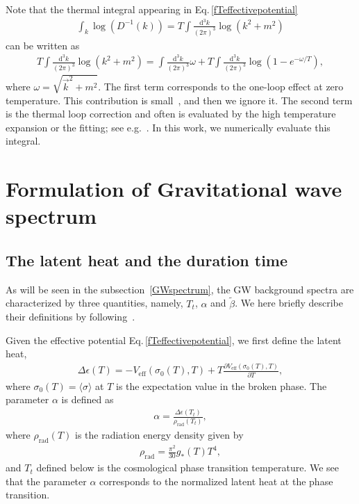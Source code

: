 \documentclass[a4paper,preprint,superscriptaddress,preprintnumbers,nofootinbib]{revtex4}
\newcommand{\al}[1]{\begin{align}#1\end{align}}
\newcommand{\p}{\partial}
\newcommand{\df}{\text{d}}
\newcommand{\fn}[1]{\!\left(#1\right)}
\newcommand{\bra}{\langle}
\newcommand{\ket}{\rangle}
\begin{document}
\begin{appendix}
Note that the thermal integral appearing in Eq.\,\eqref{fTeffectivepotential} 
\al{
\int _k \log\fn{D^{-1}\fn{k}}=T\int\frac{\df^3k}{(2\pi)^3} \log\fn{k^2+m^2}
}
can be written as
\al{
T\int\frac{\df^3k}{(2\pi)^3} \log\fn{k^2+m^2} 
=\int\frac{\df^3k}{(2\pi)^3}\omega
+T\int\frac{\df^3k}{(2\pi)^3}\log\fn{1-e^{-\omega/T}},
\label{thermaleffects}
}
where $\omega=\sqrt{\vec k^2+m^2}$.
The first term corresponds to the one-loop effect at zero temperature.
This contribution is small~\cite{Lenaghan:1999si,Lenaghan:2000ey}, and then we ignore it.
The second term is the thermal loop correction and often is evaluated by the high temperature expansion or the fitting; see e.g.~\cite{Hamada:2016gux}.
In this work,  we numerically evaluate this integral.

\section{Formulation of Gravitational wave spectrum}\label{FGWsformula}
\subsection{The latent heat and the duration time}
As will be seen in the subsection~\ref{GWspectrum}, the GW background {spectra} are characterized by three quantities, namely, $T_t$, $\alpha$ and $\tilde \beta$.
We here briefly describe their definitions by following~\cite{Linde:1981zj,Linde:2005ht}.

Given the effective potential Eq.\,\eqref{fTeffectivepotential}, we first define the latent heat,
\al{
\Delta\epsilon\fn{T} =-V_\text{eff}\fn{\sigma_0\fn{T},T} + T \frac{\p V_\text{eff}\fn{\sigma_0\fn{T},T} }{\p T},
\label{latentheat}
}
where $\sigma_0\fn{T}=\bra \sigma\ket$ at $T$ is the expectation value in the broken phase.
The parameter $\alpha$ is defined as
\al{
\alpha = \frac{\Delta\epsilon\fn{T_t}}{\rho_\text{rad}\fn{T_t}},
\label{alphaparameter}
}
where $\rho_\text{rad}\fn{T}$ is the radiation energy density given by
\al{
\rho_\text{rad}=\frac{\pi^2}{30}g_*\fn{T}T^4,
}
and $T_t$ defined below is the cosmological phase transition temperature.
We see that the parameter $\alpha$ corresponds to the normalized latent heat at the phase transition. 


\end{appendix}
\end{document}
